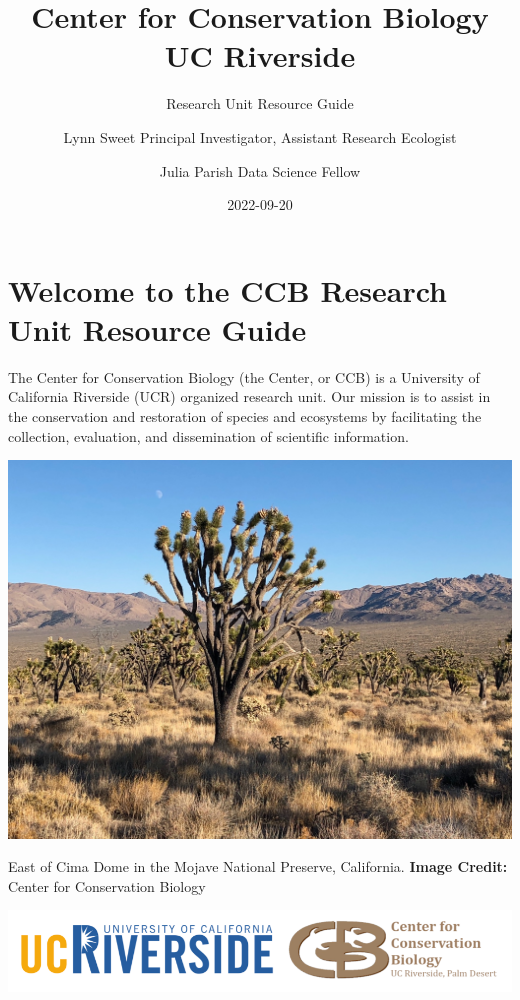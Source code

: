 \documentclass[
]{book}
\title{Center for Conservation Biology \textbar{} UC Riverside}
\subtitle{Research Unit Resource Guide}
\author{Lynn Sweet \textbar{} Principal Investigator, Assistant Research Ecologist \and Julia Parish \textbar{} Data Science Fellow}
\date{2022-09-20}
\begin{document}
\maketitle

{
\setcounter{tocdepth}{1}
\tableofcontents
}
\hypertarget{welcome-to-the-ccb-research-unit-resource-guide}{%
\chapter*{Welcome to the CCB Research Unit Resource Guide}\label{welcome-to-the-ccb-research-unit-resource-guide}}

The Center for Conservation Biology (the Center, or CCB) is a University of California Riverside (UCR) organized research unit. Our mission is to assist in the conservation and restoration of species and ecosystems by facilitating the collection, evaluation, and dissemination of scientific information.

\includegraphics[width=1\linewidth]{images/cima2019}

East of Cima Dome in the Mojave National Preserve, California.
\textbf{Image Credit:} Center for Conservation Biology

\begin{center}\includegraphics[width=0.75\linewidth]{images/ucrccb} \end{center}
\end{document}
